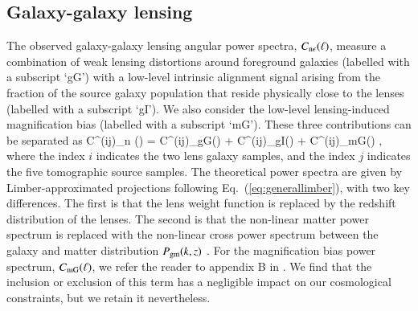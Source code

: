 \subsection{Galaxy-galaxy lensing}
\label{sec:GGL}
The observed galaxy-galaxy lensing angular power spectra, $C_{\rm n \epsilon}(\ell)$, measure a combination of weak lensing distortions around foreground galaxies (labelled with a subscript `gG') with a low-level intrinsic alignment signal arising from the fraction of the source galaxy population that reside physically close to the lenses (labelled with a subscript `gI').   We also consider the low-level lensing-induced magnification bias (labelled with a subscript `mG').   These three contributions can be separated as 
\be
\label{eq:cl_ggl}
C^{(ij)}_{\rm n \epsilon}(\ell) = C^{(ij)}_{\rm gG}(\ell) +
C^{(ij)}_{\rm gI}(\ell) + C^{(ij)}_{\rm mG}(\ell)  \;,
\ee
where the index $i$ indicates the two lens galaxy samples, and the index $j$ indicates the five tomographic source samples.   The theoretical power spectra are given by Limber-approximated projections following Eq.~(\ref{eq:generallimber}), with two key differences.   The first is that the lens weight function is replaced by the redshift distribution of the lenses.   The second is that the non-linear matter power spectrum is replaced with the non-linear cross power spectrum between the galaxy and matter distribution $P_{\rm gm}(k,z)$ \citep[see equations 24 and 25 of][for the full expressions]{joachimi/etal:inprep}.   For the magnification bias power spectrum, $C_{\rm mG}(\ell)$, we refer the reader to appendix B in \citet{joachimi/etal:inprep}.   We find that the inclusion or exclusion of this term has a negligible impact on our cosmological constraints, but we retain it nevertheless.

